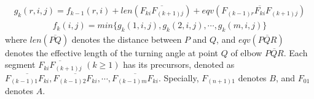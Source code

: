 \documentclass[journal]{IEEEtran}
\begin{document}
\begin{equation}\label{eqn:dp1}
\begin{split}
g_k(r, i, j) = f_{k-1}(r, i) + len(\overline{F_{ki}F_{(k+1)j}}) + eqv(\overline{F_{(k-1)r}F_{ki}F_{(k+1)j}})
\end{split}
\end{equation}
\begin{equation}\label{eqn:dp1}
\begin{split}
f_k(i, j) = min\{g_k(1, i, j), g_k(2, i, j), \cdots, g_k(m, i, j)\}
\end{split}
\end{equation}
\noindent where $len(\overline{PQ})$ denotes the distance between $P$ and $Q$, and $eqv(\overline{PQR})$ denotes the effective length of the turning angle at point $Q$ of elbow $\overline{PQR}$. 
Each segment $\overline{F_{ki}F_{(k+1)j}}$ $(k \geq 1)$ has its precursors, denoted as $\overline{F_{(k-1)1}F_{ki}}, \overline{F_{(k-1)2}F_{ki}}, \cdots, \overline{F_{(k-1)m}F_{ki}}$.
Specially, $F_{(n+1)1}$ denotes $B$, and $F_{01}$ denotes $A$. 


\end{document}
